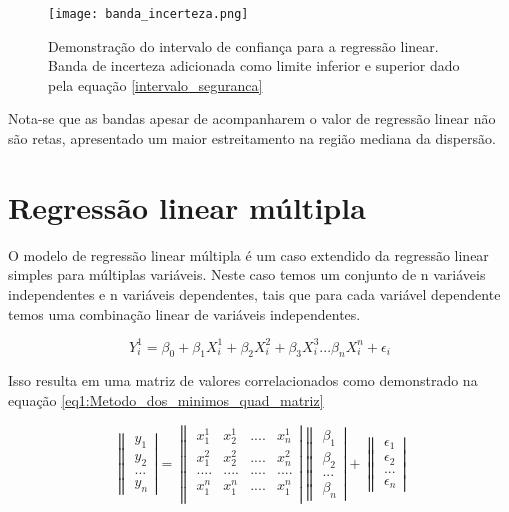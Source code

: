   \begin{figure}[H]
  	\centering
  	\texttt{[image: banda\_incerteza.png]}	
  	\caption{Demonstração do intervalo de confiança para a regressão linear. Banda de incerteza adicionada como limite inferior e superior dado pela equação \eqref{intervalo_seguranca} }
  	\label{inter_seg}
  \end{figure}
  
  Nota-se que as bandas apesar de acompanharem o valor de regressão linear não são retas, apresentado um maior estreitamento na região mediana da dispersão. 
  
 \section{Regressão linear múltipla}
 
 O modelo de regressão linear múltipla é um caso extendido da regressão linear simples para múltiplas variáveis. Neste caso temos um conjunto de n variáveis independentes e n variáveis dependentes, tais que para cada variável dependente temos uma combinação linear de variáveis independentes.
 
  \begin{equation}\label{eq1:Metodo_dos_minimos_quad}
  Y_{i}^{1} = \beta_{0} + \beta_{1} X_{i}^{1} + \beta_{2} X_{i}^{2} + \beta_{3} X_{i}^{3} ...\beta_{n} X_{i}^{n} + \epsilon_{i}
  \end{equation} 
  
  Isso resulta em uma matriz de valores correlacionados como demonstrado na equação \eqref{eq1:Metodo_dos_minimos_quad_matriz}
  
  
   \begin{equation}\label{eq1:Metodo_dos_minimos_quad_matriz}
   \left\|\begin{array}{rcr}
       y_{1}\\
       y_{2}\\
       ...\\
       y_{n}
   \end{array}\right| = 
   \left\| \begin{array}{cccc}
	   x_{1}^{1}&x_{2}^{1}&....&x_{n}^{1}\\
	   x_{1}^{2}&x_{2}^{2}&....&x_{n}^{2}\\
	   ....&....&....& ....\\
	   x_{1}^{n}&x_{1}^{n}&....&x_{1}^{n}\\ 
   \end{array} \right|  
   \left\|\begin{array}{rcr}
   \beta_{1}\\
   \beta_{2}\\
   ...\\
   \beta_{n}
   \end{array}\right| 
   +   
   \left\|\begin{array}{rcr}
   \epsilon_{1}\\
   \epsilon_{2}\\
   ...\\
   \epsilon_{n}
   \end{array}\right| 
   \end{equation} 
 
